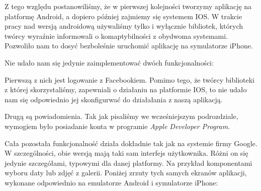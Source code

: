\documentclass[licencjacka]{pracamgr}
\begin{document}
Z tego względu postanowiliśmy, że w pierwszej kolejności tworzymy aplikację na platformę Android, a dopiero później zajmiemy się systemem IOS. W trakcie pracy nad wersją androidową używaliśmy tylko i wyłącznie bibliotek, których twórcy wyraźnie informowali o komaptybilności z obydwoma systemami. Pozwoliło nam to dosyć bezboleśnie uruchomić aplikację na symulatorze iPhone. 

Nie udało nam się jedynie zaimplementować dwóch funkcjonalności:

Pierwszą z nich jest logowanie z Facebookiem. Pomimo tego, że twórcy biblioteki z której skorzystaliśmy, zapewniali o działaniu na platformie IOS, to nie udało nam się odpowiednio jej skonfigurwać do działałania z naszą aplikacją.

Drugą są powiadomienia. Tak jak pisaliśmy we wcześniejszym podrozdziale, wymogiem było posiadanie konta w programie \textit{Apple Developer Program}. 

Cała pozostała funkcjonalność działa dokładnie tak jak na systemie firmy Google. W szczególności, obie wersją mają taki sam interfejs użytkownika. Różni on się jedynie szczegółami, typowymi dla danej platformy. Na przykład komponentami wyboru daty lub zdjęć z galerii. Poniżej zrzuty tych samych ekranów aplikacji, wykonane odpowiednio na emulatorze Android i symulatorze iPhone:
\end{document}
